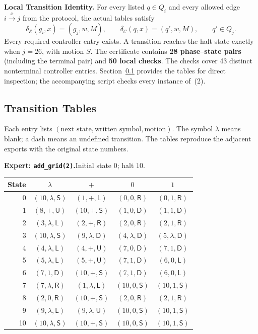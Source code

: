 \documentclass[11pt,a4paper]{article}
\newcommand{\blank}{\lambda}
\newcommand{\EXPERT}{\mathcal E}
\newcommand{\CTRL}{\mathcal C}
\newcommand{\triple}[3]{(#1,#2,\mathsf{#3})}
\newcommand{\code}[1]{\texttt{#1}}
\begin{document}
\textbf{Local Transition Identity.} For every listed $q\in Q_i$ and every allowed
edge $i\xrightarrow{x}j$ from the protocol, the actual tables satisfy
\begin{equation}
\delta_\EXPERT(g_i,x)=(g_j,w,M),\qquad
\delta_\CTRL(q,x)=(q',w,M),\qquad q'\in Q_j. \tag{2}
\end{equation}
Every required controller entry exists. A transition reaches the halt
state exactly when $j=26$, with motion $S$.
The certificate contains \textbf{28 phase--state pairs} (including the terminal pair)
and \textbf{50 local checks}. The checks cover 43 distinct nonterminal
controller entries. Section~\ref{sec:tables} provides the tables for direct
inspection; the accompanying script checks every instance of~(2).

\newpage
\subsection{Transition Tables}\label{sec:tables}
Each entry lists $(\text{next state},\text{written symbol},\text{motion})$.
The symbol $\blank$ means blank; a dash means an undefined transition.
The tables reproduce the adjacent exports with the original state numbers.

\textbf{Expert: \code{add\_grid(2)}.}\quad Initial state $0$; halt $10$.
\begin{center}
\fontsize{9.4}{11.2}\selectfont\renewcommand{\arraystretch}{1.06}
\setlength{\tabcolsep}{10pt}
\begin{tabular}{rcccc}
\toprule
\rowcolor{Pale}State & $\blank$ & $+$ & $0$ & $1$\\
\midrule
0 & $\triple{10}{\blank}{S}$ & $\triple{1}{+}{L}$ & $\triple{0}{0}{R}$ & $\triple{0}{1}{R}$ \\
1 & $\triple{8}{+}{U}$ & $\triple{10}{+}{S}$ & $\triple{1}{0}{D}$ & $\triple{1}{1}{D}$ \\
2 & $\triple{3}{\blank}{L}$ & $\triple{2}{+}{R}$ & $\triple{2}{0}{R}$ & $\triple{2}{1}{R}$ \\
3 & $\triple{10}{\blank}{S}$ & $\triple{9}{\blank}{D}$ & $\triple{4}{\blank}{D}$ & $\triple{5}{\blank}{D}$ \\
4 & $\triple{4}{\blank}{L}$ & $\triple{4}{+}{U}$ & $\triple{7}{0}{D}$ & $\triple{7}{1}{D}$ \\
5 & $\triple{5}{\blank}{L}$ & $\triple{5}{+}{U}$ & $\triple{7}{1}{D}$ & $\triple{6}{0}{L}$ \\
6 & $\triple{7}{1}{D}$ & $\triple{10}{+}{S}$ & $\triple{7}{1}{D}$ & $\triple{6}{0}{L}$ \\
7 & $\triple{7}{\blank}{R}$ & $\triple{1}{\blank}{L}$ & $\triple{10}{0}{S}$ & $\triple{10}{1}{S}$ \\
8 & $\triple{2}{0}{R}$ & $\triple{10}{+}{S}$ & $\triple{2}{0}{R}$ & $\triple{2}{1}{R}$ \\
9 & $\triple{9}{\blank}{L}$ & $\triple{9}{\blank}{U}$ & $\triple{10}{0}{S}$ & $\triple{10}{1}{S}$ \\
10 & $\triple{10}{\blank}{S}$ & $\triple{10}{+}{S}$ & $\triple{10}{0}{S}$ & $\triple{10}{1}{S}$ \\
\bottomrule
\end{tabular}
\end{center}
\end{document}
